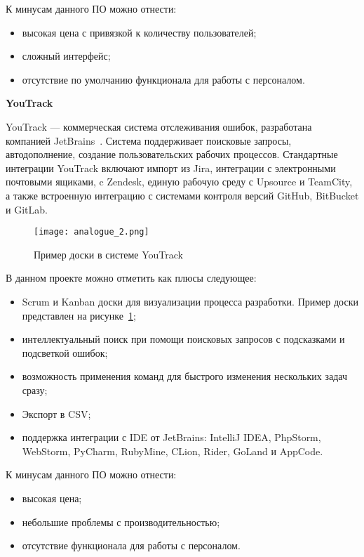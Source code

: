 К минусам данного ПО можно отнести:
\begin{itemize}
    \item высокая цена с привязкой к количеству пользователей;
    \item сложный интерфейс;
    \item отсутствие по умолчанию функционала для работы с персоналом.
\end{itemize}

\bigskip
\textbf{YouTrack}

YouTrack — коммерческая система отслеживания ошибок, разработана компанией JetBrains~\cite{analogue_2}. Система поддерживает поисковые запросы, автодополнение, создание пользовательских рабочих процессов. Стандартные интеграции YouTrack включают импорт из Jira, интеграции с электронными почтовыми ящиками, c Zendesk, единую рабочую среду с Upsource и TeamCity, а также встроенную интеграцию с системами контроля версий GitHub, BitBucket и GitLab.

\begin{figure}[ht]
    \centering
	\texttt{[image: analogue\_2.png]}
	\caption{Пример доски в системе YouTrack}\label{fig:analysis:analogue_2:picture}
\end{figure}

В данном проекте можно отметить как плюсы следующее:
\begin{itemize}
    \item Scrum и Kanban доски для визуализации процесса разработки. Пример доски представлен на рисунке~\ref{fig:analysis:analogue_2:picture};
    \item интеллектуальный поиск при помощи поисковых запросов с подсказками и подсветкой ошибок;
    \item возможность применения команд для быстрого изменения нескольких задач сразу;
    \item Экспорт в CSV;
    \item поддержка интеграции с IDE от JetBrains: IntelliJ IDEA, PhpStorm, WebStorm, PyCharm, RubyMine, CLion, Rider, GoLand и AppCode.
\end{itemize}

К минусам данного ПО можно отнести:
\begin{itemize}
    \item высокая цена;
    \item небольшие проблемы с производительностью;
    \item отсутствие функционала для работы с персоналом.
\end{itemize}

